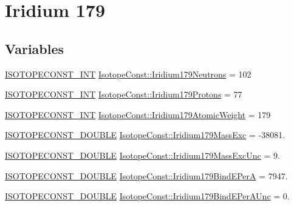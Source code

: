 \hypertarget{group___isotope_const-_iridium-_ir179}{}\section{Iridium 179}
\label{group___isotope_const-_iridium-_ir179}
\subsection*{Variables}
\begin{DoxyCompactItemize}
\item 
\mbox{\hyperlink{group___isotope_const-_macros_ga5f18360b3e99483a35c32d789e62621c}{I\+S\+O\+T\+O\+P\+E\+C\+O\+N\+S\+T\+\_\+\+I\+NT}} \mbox{\hyperlink{group___isotope_const-_iridium-_ir179_gac33a1439721484784b8b009db71fd211}{Isotope\+Const\+::\+Iridium179\+Neutrons}} = 102
\item 
\mbox{\hyperlink{group___isotope_const-_macros_ga5f18360b3e99483a35c32d789e62621c}{I\+S\+O\+T\+O\+P\+E\+C\+O\+N\+S\+T\+\_\+\+I\+NT}} \mbox{\hyperlink{group___isotope_const-_iridium-_ir179_ga0f77ac7ca9d7f856b0b91b18faa1d7e5}{Isotope\+Const\+::\+Iridium179\+Protons}} = 77
\item 
\mbox{\hyperlink{group___isotope_const-_macros_ga5f18360b3e99483a35c32d789e62621c}{I\+S\+O\+T\+O\+P\+E\+C\+O\+N\+S\+T\+\_\+\+I\+NT}} \mbox{\hyperlink{group___isotope_const-_iridium-_ir179_ga8fc5f6ea5d3211f86c96b0c0abb24a04}{Isotope\+Const\+::\+Iridium179\+Atomic\+Weight}} = 179
\item 
\mbox{\hyperlink{group___isotope_const-_macros_ga8f45a7272ce02c0b4c65c44636ed719a}{I\+S\+O\+T\+O\+P\+E\+C\+O\+N\+S\+T\+\_\+\+D\+O\+U\+B\+LE}} \mbox{\hyperlink{group___isotope_const-_iridium-_ir179_gaa73ee9c8bddc07e36b4ed96d0f4e319f}{Isotope\+Const\+::\+Iridium179\+Mass\+Exc}} = -\/38081.
\item 
\mbox{\hyperlink{group___isotope_const-_macros_ga8f45a7272ce02c0b4c65c44636ed719a}{I\+S\+O\+T\+O\+P\+E\+C\+O\+N\+S\+T\+\_\+\+D\+O\+U\+B\+LE}} \mbox{\hyperlink{group___isotope_const-_iridium-_ir179_gab7cd7dcb0cb24d94154ad397c42abb9a}{Isotope\+Const\+::\+Iridium179\+Mass\+Exc\+Unc}} = 9.
\item 
\mbox{\hyperlink{group___isotope_const-_macros_ga8f45a7272ce02c0b4c65c44636ed719a}{I\+S\+O\+T\+O\+P\+E\+C\+O\+N\+S\+T\+\_\+\+D\+O\+U\+B\+LE}} \mbox{\hyperlink{group___isotope_const-_iridium-_ir179_ga2764e579ad9f3f8db2f2c1b28f7f9397}{Isotope\+Const\+::\+Iridium179\+Bind\+E\+PerA}} = 7947.
\item 
\mbox{\hyperlink{group___isotope_const-_macros_ga8f45a7272ce02c0b4c65c44636ed719a}{I\+S\+O\+T\+O\+P\+E\+C\+O\+N\+S\+T\+\_\+\+D\+O\+U\+B\+LE}} \mbox{\hyperlink{group___isotope_const-_iridium-_ir179_ga1182317165711249d81f3bd2cf6e37a7}{Isotope\+Const\+::\+Iridium179\+Bind\+E\+Per\+A\+Unc}} = 0.

\end{DoxyCompactItemize}
